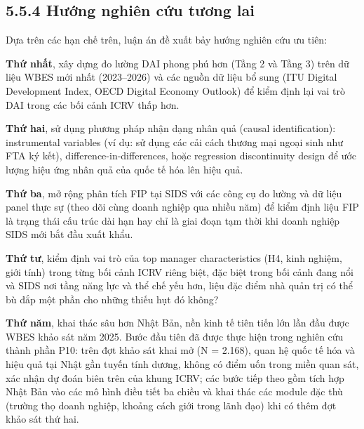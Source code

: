 \documentclass[
  a4paper,
  13pt]{extreport}
\begin{document}
\hypertarget{hux1b0ux1edbng-nghiuxean-cux1ee9u-tux1b0ux1a1ng-lai}{%
\subsection{5.5.4 Hướng nghiên cứu tương
lai}\label{hux1b0ux1edbng-nghiuxean-cux1ee9u-tux1b0ux1a1ng-lai}}

Dựa trên các hạn chế trên, luận án đề xuất bảy hướng nghiên cứu ưu tiên:

\textbf{Thứ nhất}, xây dựng đo lường DAI phong phú hơn (Tầng 2 và Tầng
3) trên dữ liệu WBES mới nhất (2023--2026) và các nguồn dữ liệu bổ sung
(ITU Digital Development Index, OECD Digital Economy Outlook) để kiểm
định lại vai trò DAI trong các bối cảnh ICRV thấp hơn.

\textbf{Thứ hai}, sử dụng phương pháp nhận dạng nhân quả (causal
identification): instrumental variables (ví dụ: sử dụng các cải cách
thương mại ngoại sinh như FTA ký kết), difference-in-differences, hoặc
regression discontinuity design để ước lượng hiệu ứng nhân quả của quốc
tế hóa lên hiệu quả.

\textbf{Thứ ba}, mở rộng phân tích FIP tại SIDS với các công cụ đo lường
và dữ liệu panel thực sự (theo dõi cùng doanh nghiệp qua nhiều năm) để
kiểm định liệu FIP là trạng thái cấu trúc dài hạn hay chỉ là giai đoạn
tạm thời khi doanh nghiệp SIDS mới bắt đầu xuất khẩu.

\textbf{Thứ tư}, kiểm định vai trò của top manager characteristics (H4,
kinh nghiệm, giới tính) trong từng bối cảnh ICRV riêng biệt, đặc biệt
trong bối cảnh đang nổi và SIDS nơi tầng năng lực và thể chế yếu hơn,
liệu đặc điểm nhà quản trị có thể bù đắp một phần cho những thiếu hụt đó
không?

\textbf{Thứ năm}, khai thác sâu hơn Nhật Bản, nền kinh tế tiên tiến lớn
lần đầu được WBES khảo sát năm 2025. Bước đầu tiên đã được thực hiện
trong nghiên cứu thành phần P10: trên đợt khảo sát khai mở (N = 2.168),
quan hệ quốc tế hóa và hiệu quả tại Nhật gần tuyến tính dương, không có
điểm uốn trong miền quan sát, xác nhận dự đoán biên trên của khung ICRV;
các bước tiếp theo gồm tích hợp Nhật Bản vào các mô hình điều tiết ba
chiều và khai thác các module đặc thù (trường thọ doanh nghiệp, khoảng
cách giới trong lãnh đạo) khi có thêm đợt khảo sát thứ hai.
\end{document}
